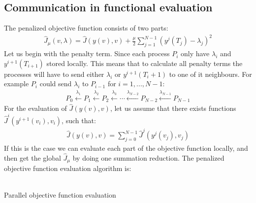 \subsection{Communication in functional evaluation}
The penalized objective function consists of two parts:
\begin{align*}
\hat J_{\mu}(v,\lambda) = \hat{J}(y(v),v) + \frac{\mu}{2}\sum_{j=1}^{N-1}(y^{j}(T_j)-\lambda_j)^2
\end{align*}
Let us begin with the penalty term. Since each process $P_i$ only have $\lambda_i$ and $y^{i+1}(T_{i+1})$ stored locally. This means that to calculate all penalty terms the processes will have to send either $\lambda_i$ or $y^{i+1}(T_i+1)$ to one of it neighbours. For example $P_i$ could send $\lambda_i$ to $P_{i-1}$ for $i=1,...,N-1$:
\begin{align*}
P_0\overset{\lambda_1}{\longleftarrow}P_1\overset{\lambda_2}{\longleftarrow}P_2 \overset{\lambda_3}{\longleftarrow}\cdots \overset{\lambda_{N-2}}{\longleftarrow}P_{N-2}\overset{\lambda_{N-1}}{\longleftarrow}P_{N-1}
\end{align*} 
For the evaluation of $ \hat{J}(y(v),v)$, let us assume that there exists functions $\hat{J}^i(y^{i+1}(v_i),v_i)$, such that:
\begin{align*}
\hat{J}(y(v),v)= \sum_{j=0}^{N-1}\hat{J}^j(y^j(v_j),v_j)
\end{align*}
If this is the case we can evaluate each part of the objective function locally, and then get the global $\hat{J}_{\mu}$ by doing one summation reduction. The penalized objective function evaluation algorithm is:
\\
\\
\begin{algorithm}[H]
\caption{Parallel objective function evaluation}
\end{algorithm}
